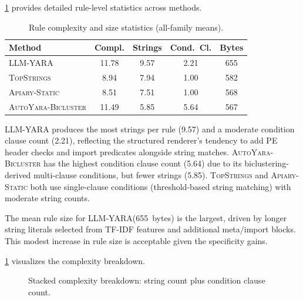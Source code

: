 \documentclass[10pt,twocolumn]{article}
\newcommand{\sysname}{\textsc{LLM-YARA}\xspace}
\newcommand{\topstrings}{\textsc{TopStrings}\xspace}
\newcommand{\apiary}{\textsc{Apiary-Static}\xspace}
\newcommand{\autoyara}{\textsc{AutoYara-Bicluster}\xspace}
\begin{document}
\cref{tab:complexity} provides detailed rule-level statistics across
methods.

\begin{table}[h]
\centering
\caption{Rule complexity and size statistics (all-family means).}
\label{tab:complexity}
\small
\begin{tabular}{@{}lcccc@{}}
\toprule
\textbf{Method}
  & \textbf{Compl.}
  & \textbf{Strings}
  & \textbf{Cond.\ Cl.}
  & \textbf{Bytes} \\
\midrule
\sysname    & 11.78 & 9.57 & 2.21 & 655 \\
\topstrings & \phantom{0}8.94 & 7.94 & 1.00 & 582 \\
\apiary     & \phantom{0}8.51 & 7.51 & 1.00 & 568 \\
\autoyara   & 11.49 & 5.85 & 5.64 & 567 \\
\bottomrule
\end{tabular}
\end{table}

\sysname produces the most strings per rule (9.57) and a moderate
condition clause count (2.21), reflecting the structured renderer's
tendency to add PE header checks and import predicates alongside
string matches.  \autoyara has the highest condition clause count
(5.64) due to its biclustering-derived multi-clause conditions, but
fewer strings (5.85).  \topstrings and \apiary both use single-clause
conditions (threshold-based string matching) with moderate string
counts.

The mean rule size for \sysname (655~bytes) is the largest, driven by
longer string literals selected from TF-IDF features and additional
meta/import blocks.  This modest increase in rule size is acceptable
given the specificity gains.

\cref{fig:complexity_bar} visualizes the complexity breakdown.

\begin{figure}[h]
\centering
{}
\caption{Stacked complexity breakdown: string count plus condition clause count.}
\label{fig:complexity_bar}
\end{figure}




\end{document}
